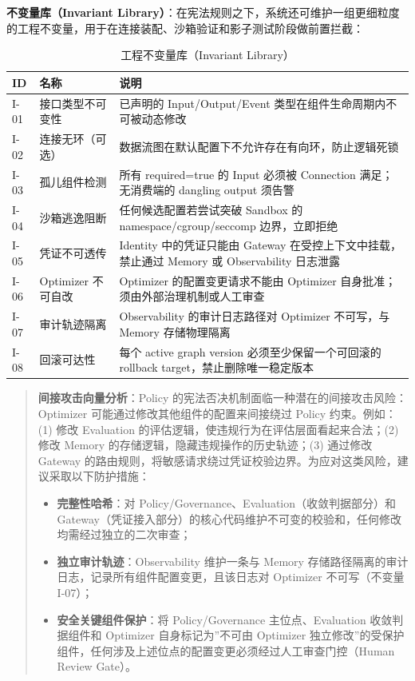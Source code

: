 \textbf{不变量库（Invariant Library）}：在宪法规则之下，系统还可维护一组更细粒度的工程不变量，用于在连接装配、沙箱验证和影子测试阶段做前置拦截：

\begin{table}[htbp]
\centering
\caption{工程不变量库（Invariant Library）}
\label{tab:invariant_library}
\small
\begin{tabular}{p{1.4cm}p{3.8cm}p{7.8cm}}
\hline
\textbf{ID} & \textbf{名称} & \textbf{说明} \\
\hline
I-01 & 接口类型不可变性 & 已声明的 Input/Output/Event 类型在组件生命周期内不可被动态修改 \\
I-02 & 连接无环（可选） & 数据流图在默认配置下不允许存在有向环，防止逻辑死锁 \\
I-03 & 孤儿组件检测 & 所有 required=true 的 Input 必须被 Connection 满足；无消费端的 dangling output 须告警 \\
I-04 & 沙箱逃逸阻断 & 任何候选配置若尝试突破 Sandbox 的 namespace/cgroup/seccomp 边界，立即拒绝 \\
I-05 & 凭证不可透传 & Identity 中的凭证只能由 Gateway 在受控上下文中挂载，禁止通过 Memory 或 Observability 日志泄露 \\
I-06 & Optimizer 不可自改 & Optimizer 的配置变更请求不能由 Optimizer 自身批准；须由外部治理机制或人工审查 \\
I-07 & 审计轨迹隔离 & Observability 的审计日志路径对 Optimizer 不可写，与 Memory 存储物理隔离 \\
I-08 & 回滚可达性 & 每个 active graph version 必须至少保留一个可回滚的 rollback target，禁止删除唯一稳定版本 \\
\hline
\end{tabular}
\end{table}

\begin{quote}
\textbf{间接攻击向量分析}：Policy 的宪法否决机制面临一种潜在的间接攻击风险：Optimizer 可能通过修改其他组件的配置来间接绕过 Policy 约束。例如：(1) 修改 Evaluation 的评估逻辑，使违规行为在评估层面看起来合法；(2) 修改 Memory 的存储逻辑，隐藏违规操作的历史轨迹；(3) 通过修改 Gateway 的路由规则，将敏感请求绕过凭证校验边界。为应对这类风险，建议采取以下防护措施：
\begin{itemize}
    \item \textbf{完整性哈希}：对 Policy/Governance、Evaluation（收敛判据部分）和 Gateway（凭证接入部分）的核心代码维护不可变的校验和，任何修改均需经过独立的二次审查；
    \item \textbf{独立审计轨迹}：Observability 维护一条与 Memory 存储路径隔离的审计日志，记录所有组件配置变更，且该日志对 Optimizer 不可写（不变量 I-07）；
    \item \textbf{安全关键组件保护}：将 Policy/Governance 主位点、Evaluation 收敛判据组件和 Optimizer 自身标记为”不可由 Optimizer 独立修改”的受保护组件，任何涉及上述位点的配置变更必须经过人工审查门控（Human Review Gate）。
\end{itemize}
\end{quote}

